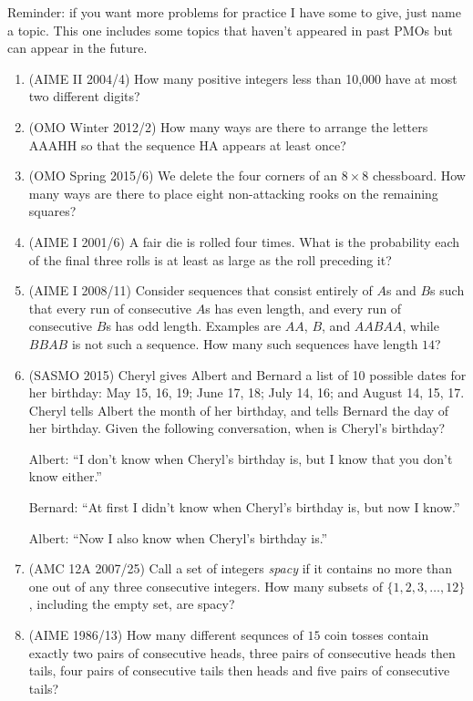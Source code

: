 \documentclass[10pt,paper=letter]{scrartcl}
\begin{document}
Reminder: if you want more problems for practice I have some to give, just name a topic. This one includes some topics that haven't appeared in past PMOs but can appear in the future. 

\begin{enumerate}
  \item (AIME II 2004/4) How many positive integers less than 10,000 have at most two different digits?

  \item (OMO Winter 2012/2) How many ways are there to arrange the letters AAAHH so that the sequence HA appears at least once?

  \item (OMO Spring 2015/6) We delete the four corners of an $8\times 8$ chessboard. How many ways are there to place eight non-attacking rooks on the remaining squares?

  \item (AIME I 2001/6) A fair die is rolled four times. What is the probability each of the final three rolls is at least as large as the roll preceding it?

  \item (AIME I 2008/11) Consider sequences that consist entirely of $A$s and $B$s such that every run of consecutive $A$s has even length, and every run of consecutive $B$s has odd length. Examples are $AA$, $B$, and $AABAA$, while $BBAB$ is not such a sequence. How many such sequences have length $14$?

  \item (SASMO 2015) Cheryl gives Albert and Bernard a list of 10 possible dates for her birthday: May 15, 16, 19; June 17, 18; July 14, 16; and August 14, 15, 17. Cheryl tells Albert the month of her birthday, and tells Bernard the day of her birthday. Given the following conversation, when is Cheryl's birthday?

  Albert: ``I don't know when Cheryl's birthday is, but I know that you don't know either.''

  Bernard: ``At first I didn't know when Cheryl's birthday is, but now I know.''

  Albert: ``Now I also know when Cheryl's birthday is.'' 

  \item (AMC 12A 2007/25) Call a set of integers \emph{spacy} if it contains no more than one out of any three consecutive integers. How many subsets of $\{1, 2, 3, \ldots, 12\}$, including the empty set, are spacy?

  \item (AIME 1986/13) How many different sequnces of $15$ coin tosses contain exactly two pairs of consecutive heads, three pairs of consecutive heads then tails, four pairs of consecutive tails then heads and five pairs of consecutive tails?

\end{enumerate}
\end{document}
